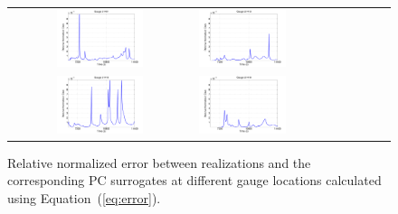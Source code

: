 \documentclass[review,12pt]{elsarticle}
\begin{document}
\begin{figure}[ht]
\centering
\begin{tabular}{clc}        
\includegraphics[width=0.5\textwidth]{Figure4a.pdf} &
\includegraphics[width=0.5\textwidth]{Figure4b.pdf} \\
\includegraphics[width=0.5\textwidth]{Figure4c.pdf} &
\includegraphics[width=0.5\textwidth]{Figure4d.pdf} 

\end{tabular}
\caption{Relative normalized error between realizations and 
the corresponding PC surrogates at different gauge locations
calculated using Equation~(\ref{eq:error}).}
\label{fig:error}
\end{figure}   
\end{document}
